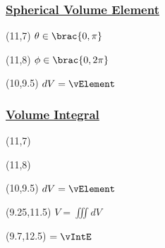 \begin{frame}\frametitle{\href{https://tex.stackexchange.com/questions/159445/draw-in-cylindrical-and-spherical-coordinates/159452}{Spherical Volume Element \color{yellow}{$dV = \dV$}}}
	\footnotesize{
	
	\begin{textblock}{4}(11,7)
		$\theta \in \brac{0, \pi}$ 
	\end{textblock}
	\begin{textblock}{4}(11,8)
		$\phi  \in \brac{0, 2\pi}$ 
	\end{textblock}
	\begin{textblock}{7}(10,9.5)
		$dV = \vElement$ 
	\end{textblock}}
\end{frame}

\begin{frame}\frametitle{\href{https://tex.stackexchange.com/questions/159445/draw-in-cylindrical-and-spherical-coordinates/159452}{Volume Integral \color{yellow}{$V = \iiint dV$}}}
	\footnotesize{
	
	\begin{textblock}{4}(11,7)
	\end{textblock}
	\begin{textblock}{4}(11,8)
	\end{textblock}
	\begin{textblock}{7}(10,9.5)
		$dV = \vElement$ 
	\end{textblock}
	\begin{textblock}{10}(9.25,11.5)
		$V = \iiint dV$ 
	\end{textblock}
	\begin{textblock}{10}(9.7,12.5)
		$=  \displaystyle\vIntE$ 
	\end{textblock}}
\end{frame}

